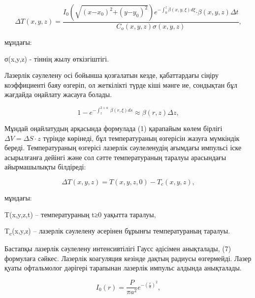 \begin{equation}
\Delta T(x,y,z) = \frac{I_{0}\left( \sqrt{\left( x\mathbf{-}x_{0} \right)^{2}\mathbf{+}\left( y\mathbf{-}y_{0} \right)^{2}} \right)e^{- \int_{0}^{z}{\beta(x,y,\xi)d\xi}}\mathbf{\cdot}\beta(x,y,z)\Delta t}{C_{o}(x,y,z)\sigma(x,y,z)},
\end{equation}

\begin{multicols}{2}
мұндағы:

σ(x,y,z) - тіннің жылу өткізгіштігі.

Лазерлік сәулелену осі бойынша қозғалатын кезде, қабаттардағы сіңіру
коэффициенті баяу өзгеріп, ол жеткілікті түрде кіші мәнге ие, сондықтан
бұл жағдайда оңайлату жасауға болады.
\end{multicols}

\begin{equation}
1 - e^{- \int_{z}^{2 + a}\mspace{2mu}\mspace{2mu}\beta(r,\xi)ds} \approx \beta(r,z)\Delta z,
\end{equation}

\begin{multicols}{2}
Мұндай оңайлатудың арқасында формулада (1) қарапайым көлем бірлігі
$\Delta V=\Delta S \cdot z$ түрінде көрінеді, бұл температураның өзгерісін жазуға
мүмкіндік береді. Температураның өзгерісі лазерлік сәулеленудің ағымдағы
импульсі іске асырылғанға дейінгі және сол сәтте температураның таралуы
арасындағы айырмашылықты білдіреді:
\end{multicols}

\begin{equation}
\Delta T(x,y,z) = T(x,y,z,0) - T_{c}(x,y,z),
\end{equation}

\begin{multicols}{2}
мұндағы:

T(x,y,z,t) -- температураның t≥0 уақытта таралуы,

T\textsubscript{c}(x,y,z) -- лазерлік сәулелену әсерінен бұрынғы
температураның таралуы.

Бастапқы лазерлік сәулелену интенсивтілігі Гаусс әдісімен анықталады,
(7) формулаға сәйкес. Лазерлік коагуляция кезінде дақтың радиусы
өзгермейді. Лазер қуаты офтальмолог дәрігері тарапынан лазерлік импульс
алдында анықталады.
\end{multicols}

\begin{equation}
I_{0}(r) = \frac{P}{\pi a^{2}}e^{- \left( \frac{r}{a} \right)^{2}},
\end{equation}

